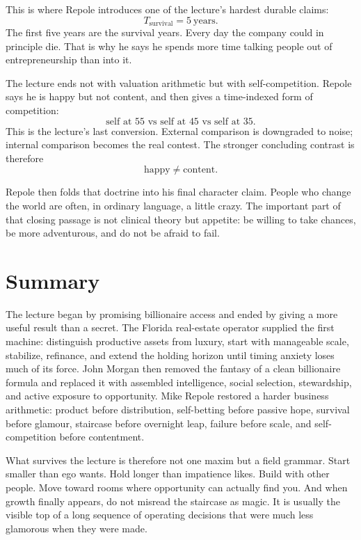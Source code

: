 This is where Repole introduces one of the lecture's hardest durable claims:
\begin{equation}
T_{\mathrm{survival}} = 5\ \text{years}.
\end{equation}
The first five years are the survival years. Every day the company could in principle die. That is why he says he spends more time talking people out of entrepreneurship than into it.

The lecture ends not with valuation arithmetic but with self-competition. Repole says he is happy but not content, and then gives a time-indexed form of competition:
\begin{equation}
\text{self at }55 \text{ vs self at }45 \text{ vs self at }35.
\end{equation}
This is the lecture's last conversion. External comparison is downgraded to noise; internal comparison becomes the real contest. The stronger concluding contrast is therefore
\begin{equation}
\text{happy} \neq \text{content}.
\end{equation}

Repole then folds that doctrine into his final character claim. People who change the world are often, in ordinary language, a little crazy. The important part of that closing passage is not clinical theory but appetite: be willing to take chances, be more adventurous, and do not be afraid to fail.

\section{Summary}

The lecture began by promising billionaire access and ended by giving a more useful result than a secret. The Florida real-estate operator supplied the first machine: distinguish productive assets from luxury, start with manageable scale, stabilize, refinance, and extend the holding horizon until timing anxiety loses much of its force. John Morgan then removed the fantasy of a clean billionaire formula and replaced it with assembled intelligence, social selection, stewardship, and active exposure to opportunity. Mike Repole restored a harder business arithmetic: product before distribution, self-betting before passive hope, survival before glamour, staircase before overnight leap, failure before scale, and self-competition before contentment.

What survives the lecture is therefore not one maxim but a field grammar. Start smaller than ego wants. Hold longer than impatience likes. Build with other people. Move toward rooms where opportunity can actually find you. And when growth finally appears, do not misread the staircase as magic. It is usually the visible top of a long sequence of operating decisions that were much less glamorous when they were made.